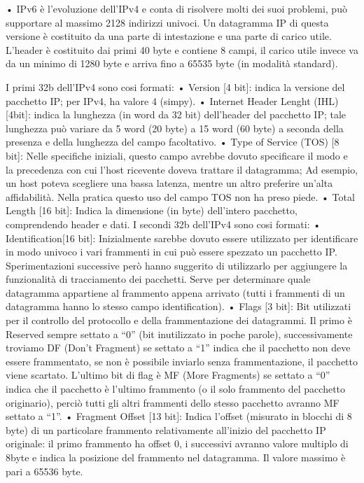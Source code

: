•	IPv6 è l’evoluzione dell’IPv4 e conta di risolvere molti dei suoi problemi, può supportare al massimo 2128 indirizzi univoci.
Un datagramma IP di questa versione è costituito da una parte di intestazione e una parte di carico utile. L’header è costituito dai primi 40 byte e contiene 8 campi, il carico utile invece va da un minimo di 1280 byte e arriva fino a 65535 byte (in modalità standard).
 
I primi 32b dell’IPv4 sono cosi formati:
•	Version [4 bit]: indica la versione del pacchetto IP; per IPv4, ha valore 4 (simpy).
•	Internet Header Lenght (IHL) [4bit]: indica la lunghezza (in word da 32 bit) dell’header del pacchetto IP; tale lunghezza può variare da 5 word (20 byte) a 15 word (60 byte) a seconda della presenza e della lunghezza del campo facoltativo.
•	Type of Service (TOS) [8 bit]: Nelle specifiche iniziali, questo campo avrebbe dovuto specificare il modo e la precedenza con cui l’host ricevente doveva trattare il datagramma;
Ad esempio, un host poteva scegliere una bassa latenza, mentre un altro preferire un’alta affidabilità. Nella pratica questo uso del campo TOS non ha preso piede.
•	Total Length [16 bit]: Indica la dimensione (in byte) dell’intero pacchetto, comprendendo header e dati.
I secondi 32b dell’IPv4 sono cosi formati:
•	Identification[16 bit]: Inizialmente sarebbe dovuto essere utilizzato per identificare in modo univoco i vari frammenti in cui può essere spezzato un pacchetto IP. Sperimentazioni successive però hanno suggerito di utilizzarlo per aggiungere la funzionalità di tracciamento dei pacchetti. Serve per determinare quale datagramma appartiene al frammento appena arrivato (tutti i frammenti di un datagramma hanno lo stesso campo identification).
•	Flags [3 bit]: Bit utilizzati per il controllo del protocollo e della frammentazione dei datagrammi. Il primo è Reserved sempre settato a “0” (bit inutilizzato in poche parole), successivamente troviamo DF (Don’t Fragment) se settato a “1” indica che il pacchetto non deve essere frammentato, se non è possibile inviarlo senza frammentazione, il pacchetto viene scartato. L’ultimo bit di flag è MF (More Fragments) se settato a “0” indica che il pacchetto è l’ultimo frammento (o il solo frammento del pacchetto originario), perciò tutti gli altri frammenti dello stesso pacchetto avranno MF settato a “1”. 
•	Fragment Offset [13 bit]: Indica l’offset (misurato in blocchi di 8 byte) di un particolare frammento relativamente all’inizio del pacchetto IP originale: il primo frammento ha offset 0, i successivi avranno valore multiplo di 8byte e indica la posizione del frammento nel datagramma. Il valore massimo è pari a 65536 byte.

